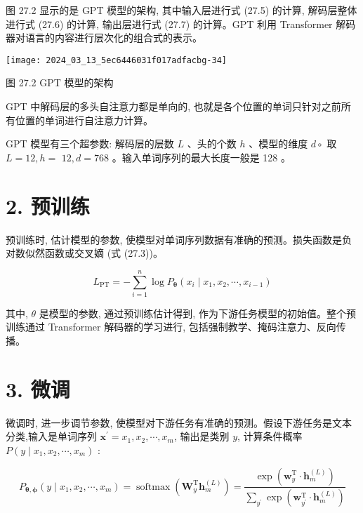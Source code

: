 \documentclass[10pt]{article}
\begin{document}
图 27.2 显示的是 GPT 模型的架构, 其中输入层进行式 (27.5) 的计算, 解码层整体进行式 (27.6) 的计算, 输出层进行式 (27.7) 的计算。GPT 利用 Transformer 解码器对语言的内容进行层次化的组合式的表示。

\begin{center}
\texttt{[image: 2024\_03\_13\_5ec6446031f017adfacbg-34]}
\end{center}

图 27.2 GPT 模型的架构

GPT 中解码层的多头自注意力都是单向的, 也就是各个位置的单词只针对之前所有位置的单词进行自注意力计算。

GPT 模型有三个超参数: 解码层的层数 $L$ 、头的个数 $h$ 、模型的维度 $d \circ$ 取 $L=12, h=$ $12, d=768$ 。输入单词序列的最大长度一般是 128 。

\section*{2. 预训练}
预训练时, 估计模型的参数, 使模型对单词序列数据有准确的预测。损失函数是负对数似然函数或交叉嫡 (式 (27.3))。


\begin{equation*}
L_{\mathrm{PT}}=-\sum_{i=1}^{n} \log P_{\boldsymbol{\theta}}\left(x_{i} \mid x_{1}, x_{2}, \cdots, x_{i-1}\right) \tag{27.8}
\end{equation*}


其中, $\theta$ 是模型的参数, 通过预训练估计得到, 作为下游任务模型的初始值。整个预训练通过 Transformer 解码器的学习进行, 包括强制教学、掩码注意力、反向传播。

\section*{3. 微调}
微调时, 进一步调节参数, 使模型对下游任务有准确的预测。假设下游任务是文本分类,输入是单词序列 $\boldsymbol{x}^{\prime}=x_{1}, x_{2}, \cdots, x_{m}$, 输出是类别 $y$, 计算条件概率 $P\left(y \mid x_{1}, x_{2}, \cdots, x_{m}\right)$ :


\begin{equation*}
P_{\boldsymbol{\theta}, \boldsymbol{\phi}}\left(y \mid x_{1}, x_{2}, \cdots, x_{m}\right)=\operatorname{softmax}\left(\boldsymbol{W}_{y}^{\mathrm{T}} \boldsymbol{h}_{m}^{(L)}\right)=\frac{\exp \left(\boldsymbol{w}_{y}^{\mathrm{T}} \cdot \boldsymbol{h}_{m}^{(L)}\right)}{\sum_{y^{\prime}} \exp \left(\boldsymbol{w}_{y^{\prime}}^{\mathrm{T}} \cdot \boldsymbol{h}_{m}^{(L)}\right)} \tag{27.9}
\end{equation*}
\end{document}

